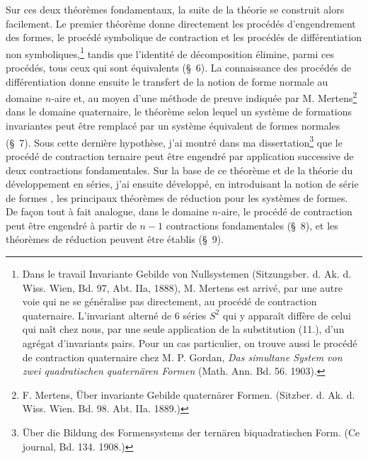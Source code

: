 \documentclass[11pt]{article}
\begin{document}
Sur ces deux théorèmes fondamentaux, la suite de la théorie se construit alors facilement. Le premier théorème donne directement les procédés d'engendrement des formes, le procédé symbolique de contraction et les procédés de différentiation non symboliques,\footnote{Dans le travail \og Invariante Gebilde von Nullsystemen \fg{} (Sitzungsber. d. Ak. d. Wiss. Wien, Bd. 97, Abt. IIa, 1888), M. Mertens est arrivé, par une autre voie qui ne se généralise pas directement, au procédé de contraction quaternaire. L'invariant alterné de 6 séries $S^2$ qui y apparaît diffère de celui qui naît chez nous, par une seule application de la substitution (11.), d'un agrégat d'invariants pairs. Pour un cas particulier, on trouve aussi le procédé de contraction quaternaire chez M. P. Gordan, \emph{Das simultane System von zwei quadratischen quaternären Formen} (Math. Ann. Bd. 56. 1903).} tandis que l'identité de décomposition élimine, parmi ces procédés, tous ceux qui sont équivalents (\S\ 6). La connaissance des procédés de différentiation donne ensuite le transfert de la notion de \og forme normale \fg{} au domaine $n$-aire et, au moyen d'une méthode de preuve indiquée par M. Mertens\footnote{F. Mertens, Über invariante Gebilde quaternärer Formen. (Sitzber. d. Ak. d. Wiss. Wien. Bd. 98. Abt. IIa. 1889.)} dans le domaine quaternaire, le théorème selon lequel un système de formations invariantes peut être remplacé par un système équivalent de formes normales (\S\ 7). Sous cette dernière hypothèse, j'ai montré dans ma dissertation\footnote{Über die Bildung des Formensystems der ternären biquadratischen Form. (Ce journal, Bd. 134. 1908.)} que le procédé de contraction ternaire peut être engendré par application successive de deux contractions fondamentales. Sur la base de ce théorème et de la théorie du développement en séries, j'ai ensuite développé, en introduisant la notion de \og série de formes \fg{}, les principaux théorèmes de réduction pour les systèmes de formes. De façon tout à fait analogue, dans le domaine $n$-aire, le procédé de contraction peut être engendré à partir de $n-1$ contractions fondamentales (\S\ 8), et les théorèmes de réduction peuvent être établis (\S\ 9).
\end{document}

